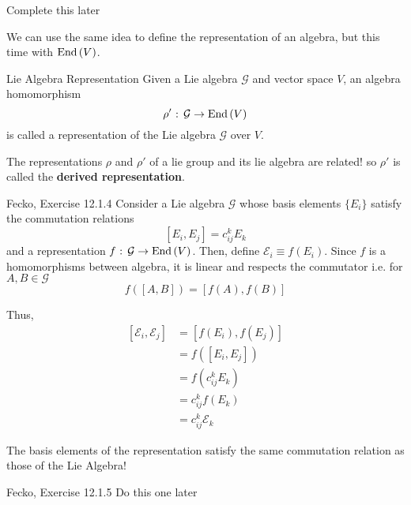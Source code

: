 \documentclass[11pt]{article}
\begin{document}
\begin{example}
  Complete this later
\end{example}

\vskip 0.5cm

We can use the same idea to define the representation of an algebra, but this time with $\mathrm{End}\left(V\right)$.

\begin{definition}{Lie Algebra Representation}
  Given a Lie algebra $\mathcal{G}$ and vector space $V$, an algebra homomorphism \[ \rho' \text{ : } \mathcal{G} \rightarrow \mathrm{End}\left(V\right) \] is called a representation of the Lie algebra $\mathcal{G}$ over $V$.
\end{definition}

\begin{remark}{The representations $\rho$ and $\rho'$ of a lie group and its lie algebra are related! so $\rho'$ is called the \textbf{derived representation}.}
\end{remark}

\begin{ex}{Fecko, Exercise 12.1.4}
    Consider a Lie algebra $\mathcal{G}$ whose basis elements $\{E_i\}$ satisfy the commutation relations 
    \[ [E_i, E_j] = c^k_{ij} E_k  \]
    and a representation $f \text{ : } \mathcal{G} \rightarrow \mathrm{End}\left(V\right)$. Then, define $\mathcal{E}_i \equiv f(E_i)$. Since $f$ is a homomorphisms between algebra, it is linear and respects the commutator i.e. for $A, B \in \mathcal{G}$
    \[ f\left( [A, B] \right) = \left[f(A), f(B)\right] \] 

    Thus, 
    \begin{align*}
      \left[ \mathcal{E}_i, \mathcal{E}_j \right] &= \left[f(E_i), f(E_j) \right] \\
      &= f\left([E_i, E_j]\right) \\
      &= f\left(c^k_{ij} E_k\right) \\
      &= c^{k}_{ij} f(E_k) \\
      &= c^{k}_{ij} \mathcal{E}_k 
    \end{align*}

    \begin{thought}{The basis elements of the representation satisfy the same commutation relation as those of the Lie Algebra!}
    \end{thought}
\end{ex}

\begin{ex}{Fecko, Exercise 12.1.5}
    Do this one later
\end{ex}
\end{document}
